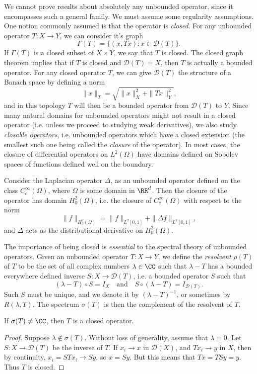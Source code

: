 We cannot prove results about absolutely any unbounded operator, since it encompasses such a general family. We must assume some regularity assumptions. One notion commonly assumed is that the operator is \emph{closed}. For any unbounded operator $T: X \to Y$, we can consider it's graph
%
\[ \Gamma(T) = \{ (x,Tx): x \in \mathcal{D}(T) \}. \]
%
If $\Gamma(T)$ is a closed subset of $X \times Y$, we say that $T$ is closed. The closed graph theorem implies that if $T$ is closed and $\mathcal{D}(T) = X$, then $T$ is actually a bounded operator. For any closed operator $T$, we can give $\mathcal{D}(T)$ the structure of a Banach space by defining a norm
%
\[ \| x \|_T = \sqrt{\| x \|_X^2 + \| Tx \|_Y^2}, \]
%
and in this topology $T$ will then be a bounded operator from $\mathcal{D}(T)$ to $Y$. Since many natural domains for unbounded operators might not result in a closed operator (i.e. unless we proceed to studying weak derivatives), we also study \emph{closable operators}, i.e. unbounded operators which have a closed extension (the smallest such one being called the \emph{closure} of the operator). In most cases, the closure of differential operators on $L^2(\Omega)$ have domains defined on Sobolev spaces of functions defined well on the boundary.

\begin{example}
    Consider the Laplacian operator $\Delta$, as an unbounded operator defined on the class $C_c^\infty(\Omega)$, where $\Omega$ is some domain in $\RR^d$. Then the closure of the operator has domain $H^2_0(\Omega)$, i.e. the closure of $C_c^\infty(\Omega)$ with respect to the norm
    \[ \| f \|_{H^2_0(\Omega)} = \| f \|_{L^2[0,1]} + \| \Delta f \|_{L^2[0,1]}, \]
    and $\Delta$ acts as the distributional derivative on $H^2_0(\Omega)$.
\end{example}

The importance of being closed is \emph{essential} to the spectral theory of unbounded operators. Given an unbounded operator $T: X \to Y$, we define the \emph{resolvent} $\rho(T)$ of $T$ to be the set of all complex numbers $\lambda \in \CC$ such that $\lambda - T$ has a bounded everywhere defined inverse $S: X \to \mathcal{D}(T)$, i.e. a bounded operator $S$ such that
%
\[ (\lambda - T) \circ S = I_X \quad\text{and}\quad S \circ (\lambda - T) = I_{\mathcal{D}(T)}. \]
%
Such $S$ must be unique, and we denote it by $(\lambda - T)^{-1}$, or sometimes by $R(\lambda,T)$. The spectrum $\sigma(T)$ is then the complement of the resolvent of $T$.

\begin{lemma}
    If $\sigma(T) \neq \CC$, then $T$ is a closed operator.
\end{lemma}
\begin{proof}
    Suppose $\lambda \not \in \sigma(T)$. Without loss of generality, assume that $\lambda = 0$. Let $S: X \to \mathcal{D}(T)$ be the inverse of $T$. If $x_i \to x$ in $\mathcal{D}(X)$, and $T x_i \to y$ in $X$, then by continuity, $x_i = STx_i \to Sy$, so $x = Sy$. But this means that $Tx = TSy = y$. Thus $T$ is closed.
\end{proof}

